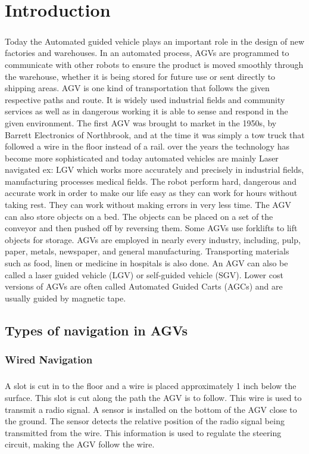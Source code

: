 \newpage
\chapter{Introduction}
\paragraph{}Today the Automated guided vehicle plays an important role in the design of new factories and warehouses. In an automated process, AGVs are programmed to communicate with other robots to ensure the product is moved smoothly through the warehouse, whether it is being stored for future use or sent directly to shipping areas.  AGV is one kind of transportation that follows the given respective paths and route. It is widely used industrial fields and community services as well as in dangerous working it is able to sense and respond in the given environment. The first AGV was brought to market in the 1950s, by Barrett Electronics of Northbrook, and at the time it was simply a tow truck that followed a wire in the floor instead of a rail. over the years the technology has become more sophisticated and today automated vehicles are mainly Laser navigated ex: LGV which works more accurately and precisely in industrial fields, manufacturing processes medical fields. The robot perform hard, dangerous and accurate work in order to make our life easy as they can work for hours without taking rest. They can work without making errors in very less time. The AGV can also store objects on a bed. The objects can be placed on a set of the conveyor and then pushed off by reversing them. Some AGVs use forklifts to lift objects for storage. AGVs are employed in nearly every industry, including, pulp, paper, metals, newspaper, and general manufacturing. Transporting materials such as food, linen or medicine in hospitals is also done. An AGV can also be called a laser guided vehicle (LGV) or self-guided vehicle (SGV). Lower cost versions of AGVs are often called Automated Guided Carts (AGCs) and are usually guided by magnetic tape.

\section{Types of navigation in AGVs}
\subsection{Wired Navigation}
\paragraph{}A slot is cut in to the floor and a wire is placed approximately 1 inch below the surface. This slot is cut along the path the AGV is to follow. This wire is used to transmit a radio signal. A sensor is installed on the bottom of the AGV close to the ground. The sensor detects the relative position of the radio signal being transmitted from the wire. This information is used to regulate the steering circuit, making the AGV follow the wire.

